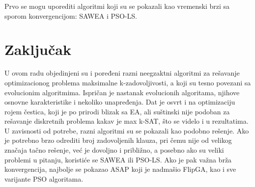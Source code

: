 \documentclass[a4paper]{article}
\begin{document}
Prvo se mogu uporediti algoritmi koji su se pokazali kao vremenski brzi sa sporom
konvergencijom: SAWEA i PSO-LS.


\section{Zaključak}
\label{sec:zakljucak}
U ovom radu objedinjeni su i poređeni razni neegzaktni algoritmi za rešavanje 
optimizacionog problema maksimalne k-zadovoljivosti, 
a koji su tesno povezani sa evolucionim algoritmima. Ispričan je nastanak 
evolucionih algoritama, njihove osnovne karakteristike i nekoliko unapređenja. 
Dat je osvrt i na optimizaciju rojem čestica, koji je po prirodi blizak sa EA,
ali suštinski nije podoban za rešavanje diskretnih problema kakav je max k-SAT, 
što se videlo i u rezultatima. U zavisnosti od potrebe, razni algoritmi su se pokazali
kao podobno rešenje. Ako je potrebno brzo odrediti broj zadovoljenih klauza,
pri čemu nije od velikog značaja tačno rešenje, već je dovoljno i približno,
a posebno ako su veliki problemi u pitanju, koristiće se SAWEA ili PSO-LS.
Ako je pak važna brža konvergencija, najbolje se pokazao ASAP koji je nadmašio 
FlipGA, kao i sve varijante PSO algoritama.



\appendix
 

\end{document}
